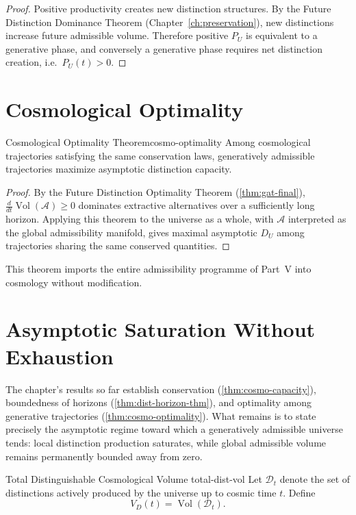 \documentclass[12pt,twoside,openright]{book}
\newcommand{\Vol}{\operatorname{Vol}}
\begin{document}
\begin{proof}
  Positive productivity creates new distinction structures.
  By the Future Distinction Dominance Theorem
  (Chapter~\ref{ch:preservation}), new distinctions
  increase future admissible volume. Therefore positive
  $P_U$ is equivalent to a generative phase, and conversely
  a generative phase requires net distinction creation,
  i.e.\ $P_U(t) > 0$.
\end{proof}

\section{Cosmological Optimality}
\label{sec:ch19-optimality}

\begin{theorem}{Cosmological Optimality Theorem}{cosmo-optimality}
  Among cosmological trajectories satisfying the same
  conservation laws, generatively admissible trajectories
  maximize asymptotic distinction capacity.
\end{theorem}

\begin{proof}
  By the Future Distinction Optimality Theorem
  (\cref{thm:gat-final}), $\frac{d}{dt}\Vol(\mathcal{A}) \ge 0$
  dominates extractive alternatives over a sufficiently
  long horizon. Applying this theorem to the universe as a
  whole, with $\mathcal{A}$ interpreted as the global
  admissibility manifold, gives maximal asymptotic $D_U$
  among trajectories sharing the same conserved quantities.
\end{proof}

This theorem imports the entire admissibility programme of
Part~V into cosmology without modification.

\section{Asymptotic Saturation Without Exhaustion}
\label{sec:ch19-saturation}

The chapter's results so far establish conservation
(\cref{thm:cosmo-capacity}), boundedness of horizons
(\cref{thm:dist-horizon-thm}), and optimality among
generative trajectories (\cref{thm:cosmo-optimality}). What
remains is to state precisely the asymptotic regime toward
which a generatively admissible universe tends: local
distinction production saturates, while global admissible
volume remains permanently bounded away from zero.

\begin{definition}{Total Distinguishable Cosmological Volume}%
  {total-dist-vol}
  Let $\mathcal{D}_t$ denote the set of distinctions
  actively produced by the universe up to cosmic time $t$.
  Define
  \[
    V_D(t) = \Vol(\mathcal{D}_t).
  \]
\end{definition}
\end{document}
